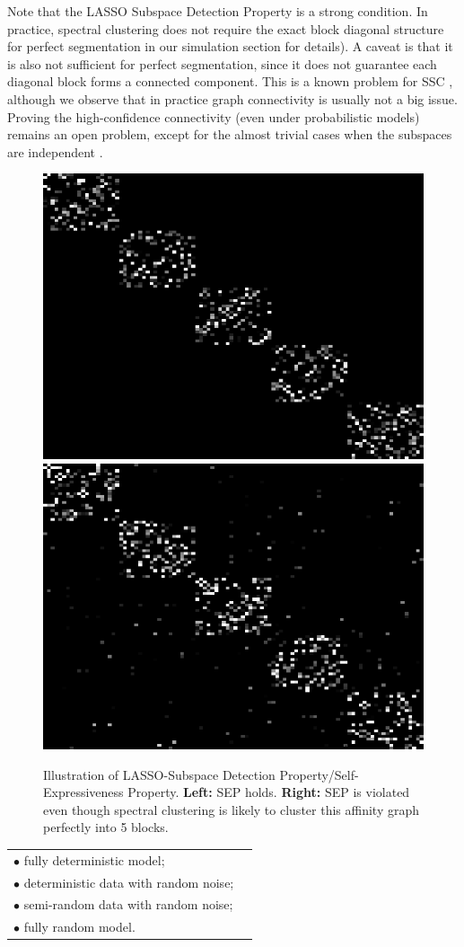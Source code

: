 \documentclass[main]{subfiles}
\begin{document}
Note that the LASSO Subspace Detection Property is a strong condition. In practice, spectral clustering does not require the exact block diagonal structure for perfect segmentation in our simulation section for details). A caveat is that it is also not sufficient for perfect segmentation, since it does not guarantee each diagonal block forms a connected component. This is a known problem for SSC \cite{nasihatkon2011graph}, although we observe that in practice graph connectivity is usually not a big issue. Proving the high-confidence connectivity (even under probabilistic models) remains an open problem, except for the almost trivial cases when the subspaces are independent \cite{liu2013LRR, wang2013provable}.

\begin{figure}
  \centering
  \includegraphics[width=0.35\linewidth]{pics/SEP.png}
  \includegraphics[width=0.35\linewidth]{pics/ViolateSEP.png}\\
  \caption{Illustration of LASSO-Subspace Detection Property/Self-Expressiveness Property. \textbf{Left:} SEP holds. \textbf{Right:} SEP is violated even though spectral clustering is likely to cluster this affinity graph perfectly into 5 blocks.}\label{fig:SEP}
\end{figure}

\begin{tabular}{ll}
  $\bullet$ fully deterministic model;\\
  $\bullet$ deterministic data with random noise;\\
  $\bullet$ semi-random data with random noise;\\
  $\bullet$ fully random model.
\end{tabular}
\end{document}
